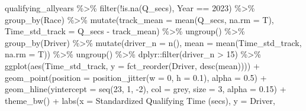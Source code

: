 \documentclass[
]{book}
\newenvironment{Shaded}{\begin{snugshade}}{\end{snugshade}}
\newcommand{\AttributeTok}[1]{\textcolor[rgb]{0.77,0.63,0.00}{#1}}
\newcommand{\DecValTok}[1]{\textcolor[rgb]{0.00,0.00,0.81}{#1}}
\newcommand{\FloatTok}[1]{\textcolor[rgb]{0.00,0.00,0.81}{#1}}
\newcommand{\FunctionTok}[1]{\textcolor[rgb]{0.00,0.00,0.00}{#1}}
\newcommand{\NormalTok}[1]{#1}
\newcommand{\SpecialCharTok}[1]{\textcolor[rgb]{0.00,0.00,0.00}{#1}}
\newcommand{\StringTok}[1]{\textcolor[rgb]{0.31,0.60,0.02}{#1}}
\begin{document}
\begin{Shaded}
\begin{Highlighting}[]
\NormalTok{qualifying\_allyears }\SpecialCharTok{\%\textgreater{}\%}
  \FunctionTok{filter}\NormalTok{(}\SpecialCharTok{!}\FunctionTok{is.na}\NormalTok{(Q\_secs),}
\NormalTok{         Year }\SpecialCharTok{==} \DecValTok{2023}\NormalTok{) }\SpecialCharTok{\%\textgreater{}\%}
  \FunctionTok{group\_by}\NormalTok{(Race) }\SpecialCharTok{\%\textgreater{}\%}
  \FunctionTok{mutate}\NormalTok{(}\AttributeTok{track\_mean =} \FunctionTok{mean}\NormalTok{(Q\_secs, }\AttributeTok{na.rm =}\NormalTok{ T),}
         \AttributeTok{Time\_std\_track =}\NormalTok{ Q\_secs }\SpecialCharTok{{-}}\NormalTok{ track\_mean) }\SpecialCharTok{\%\textgreater{}\%} 
  \FunctionTok{ungroup}\NormalTok{() }\SpecialCharTok{\%\textgreater{}\%} 
  \FunctionTok{group\_by}\NormalTok{(Driver) }\SpecialCharTok{\%\textgreater{}\%} 
  \FunctionTok{mutate}\NormalTok{(}\AttributeTok{driver\_n =} \FunctionTok{n}\NormalTok{(),}
         \AttributeTok{mean =} \FunctionTok{mean}\NormalTok{(Time\_std\_track, }\AttributeTok{na.rm =}\NormalTok{ T)) }\SpecialCharTok{\%\textgreater{}\%}
  \FunctionTok{ungroup}\NormalTok{() }\SpecialCharTok{\%\textgreater{}\%}
\NormalTok{  dplyr}\SpecialCharTok{::}\FunctionTok{filter}\NormalTok{(driver\_n }\SpecialCharTok{\textgreater{}} \DecValTok{15}\NormalTok{) }\SpecialCharTok{\%\textgreater{}\%} 
  \FunctionTok{ggplot}\NormalTok{(}\FunctionTok{aes}\NormalTok{(Time\_std\_track, }\AttributeTok{y =} \FunctionTok{fct\_reorder}\NormalTok{(Driver, }\FunctionTok{desc}\NormalTok{(mean)))) }\SpecialCharTok{+}
  \FunctionTok{geom\_point}\NormalTok{(}\AttributeTok{position =} \FunctionTok{position\_jitter}\NormalTok{(}\AttributeTok{w =} \DecValTok{0}\NormalTok{, }\AttributeTok{h =} \FloatTok{0.1}\NormalTok{), }\AttributeTok{alpha =} \FloatTok{0.5}\NormalTok{) }\SpecialCharTok{+}
  \FunctionTok{geom\_hline}\NormalTok{(}\AttributeTok{yintercept =} \FunctionTok{seq}\NormalTok{(}\DecValTok{23}\NormalTok{, }\DecValTok{1}\NormalTok{, }\SpecialCharTok{{-}}\DecValTok{2}\NormalTok{), }\AttributeTok{col =} \StringTok{\textquotesingle{}grey\textquotesingle{}}\NormalTok{, }\AttributeTok{size =} \DecValTok{3}\NormalTok{, }\AttributeTok{alpha =} \FloatTok{0.15}\NormalTok{) }\SpecialCharTok{+}
  \FunctionTok{theme\_bw}\NormalTok{() }\SpecialCharTok{+}
  \FunctionTok{labs}\NormalTok{(}\AttributeTok{x =} \StringTok{\textquotesingle{}Standardized Qualifying Time (secs)\textquotesingle{}}\NormalTok{,}
       \AttributeTok{y =} \StringTok{\textquotesingle{}Driver\textquotesingle{}}\NormalTok{,}

\end{Highlighting}
\end{Shaded}
\end{document}
